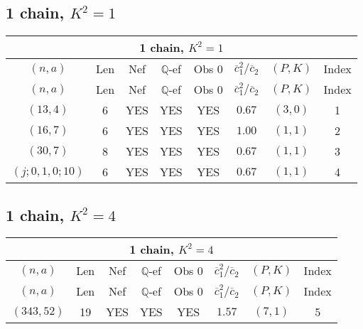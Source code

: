 \subsection{1 chain, $K^2 = 1$}
\begin{longtable}{|c|c|c|c|c|c|c|c|}
\hline
\multicolumn{8}{|c|}{1 chain, $K^2 = 1$}\\
\hline
$(n,a)$ & Len & Nef & $\mathbb Q$-ef & Obs 0 & $\overline c_1^2 / \overline c_2$ & $(P,K)$ & Index\\
\hline
\endfirsthead

\hline
$(n,a)$ & Len & Nef & $\mathbb Q$-ef & Obs 0 & $\overline c_1^2 / \overline c_2$ & $(P,K)$ & Index\\
\hline
\endhead
\hline
\endfoot

$(13,4)$ & 6 & YES & YES & YES & $0.67$ & $(3,0)$ & 1\\
$(16,7)$ & 6 & YES & YES & YES & $1.00$ & $(1,1)$ & 2\\
$(30,7)$ & 8 & YES & YES & YES & $0.67$ & $(1,1)$ & 3\\
$(j;0,1,0;10)$ & 6 & YES & YES & YES & $0.67$ & $(1,1)$ & 4
\end{longtable}
\subsection{1 chain, $K^2 = 4$}
\begin{longtable}{|c|c|c|c|c|c|c|c|}
\hline
\multicolumn{8}{|c|}{1 chain, $K^2 = 4$}\\
\hline
$(n,a)$ & Len & Nef & $\mathbb Q$-ef & Obs 0 & $\overline c_1^2 / \overline c_2$ & $(P,K)$ & Index\\
\hline
\endfirsthead

\hline
$(n,a)$ & Len & Nef & $\mathbb Q$-ef & Obs 0 & $\overline c_1^2 / \overline c_2$ & $(P,K)$ & Index\\
\hline
\endhead
\hline
\endfoot

$(343,52)$ & 19 & YES & YES & YES & $1.57$ & $(7,1)$ & 5
\end{longtable}

